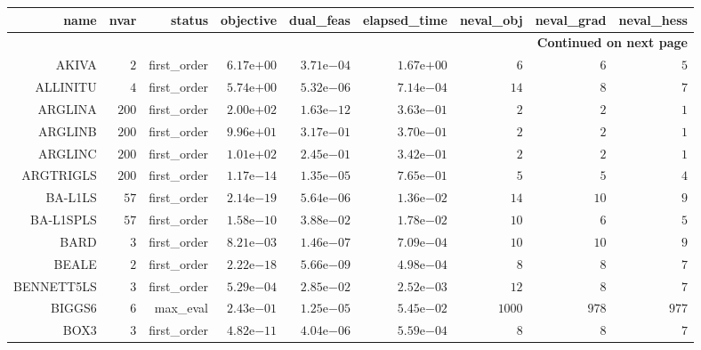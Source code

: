 \begin{longtable}{rrrrrrrrr}
\hline
name & nvar & status & objective & dual\_feas & elapsed\_time & neval\_obj & neval\_grad & neval\_hess \\\hline
\endhead
\hline
\multicolumn{9}{r}{{\bfseries Continued on next page}}\\
\hline
\endfoot
\endlastfoot
AKIVA & \(     2\) & first\_order & \( 6.17\)e\(+00\) & \( 3.71\)e\(-04\) & \( 1.67\)e\(+00\) & \(     6\) & \(     6\) & \(     5\) \\
ALLINITU & \(     4\) & first\_order & \( 5.74\)e\(+00\) & \( 5.32\)e\(-06\) & \( 7.14\)e\(-04\) & \(    14\) & \(     8\) & \(     7\) \\
ARGLINA & \(   200\) & first\_order & \( 2.00\)e\(+02\) & \( 1.63\)e\(-12\) & \( 3.63\)e\(-01\) & \(     2\) & \(     2\) & \(     1\) \\
ARGLINB & \(   200\) & first\_order & \( 9.96\)e\(+01\) & \( 3.17\)e\(-01\) & \( 3.70\)e\(-01\) & \(     2\) & \(     2\) & \(     1\) \\
ARGLINC & \(   200\) & first\_order & \( 1.01\)e\(+02\) & \( 2.45\)e\(-01\) & \( 3.42\)e\(-01\) & \(     2\) & \(     2\) & \(     1\) \\
ARGTRIGLS & \(   200\) & first\_order & \( 1.17\)e\(-14\) & \( 1.35\)e\(-05\) & \( 7.65\)e\(-01\) & \(     5\) & \(     5\) & \(     4\) \\
BA-L1LS & \(    57\) & first\_order & \( 2.14\)e\(-19\) & \( 5.64\)e\(-06\) & \( 1.36\)e\(-02\) & \(    14\) & \(    10\) & \(     9\) \\
BA-L1SPLS & \(    57\) & first\_order & \( 1.58\)e\(-10\) & \( 3.88\)e\(-02\) & \( 1.78\)e\(-02\) & \(    10\) & \(     6\) & \(     5\) \\
BARD & \(     3\) & first\_order & \( 8.21\)e\(-03\) & \( 1.46\)e\(-07\) & \( 7.09\)e\(-04\) & \(    10\) & \(    10\) & \(     9\) \\
BEALE & \(     2\) & first\_order & \( 2.22\)e\(-18\) & \( 5.66\)e\(-09\) & \( 4.98\)e\(-04\) & \(     8\) & \(     8\) & \(     7\) \\
BENNETT5LS & \(     3\) & first\_order & \( 5.29\)e\(-04\) & \( 2.85\)e\(-02\) & \( 2.52\)e\(-03\) & \(    12\) & \(     8\) & \(     7\) \\
BIGGS6 & \(     6\) & max\_eval & \( 2.43\)e\(-01\) & \( 1.25\)e\(-05\) & \( 5.45\)e\(-02\) & \(  1000\) & \(   978\) & \(   977\) \\
BOX3 & \(     3\) & first\_order & \( 4.82\)e\(-11\) & \( 4.04\)e\(-06\) & \( 5.59\)e\(-04\) & \(     8\) & \(     8\) & \(     7\) \\

\end{longtable}

